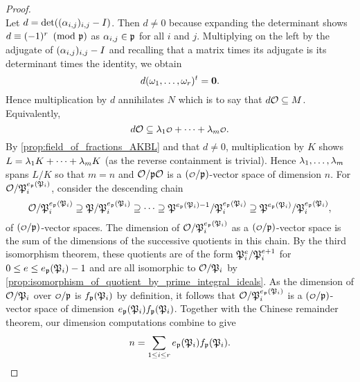 \begin{proof}
\[      \]
      Let $d = \det((\alpha_{i,j})_{i,j}-I)$. Then $d \neq 0$ because expanding the determinant shows $d \equiv (-1)^{r} \ \left(\text{mod }\mathfrak{p}\right)$ as $\alpha_{i,j} \in \mathfrak{p}$ for all $i$ and $j$. Multiplying on the left by the adjugate of $(\alpha_{i,j})_{i,j}-I$ and recalling that a matrix times its adjugate is its determinant times the identity, we obtain
      \[
        d(\omega_{1},\ldots,\omega_{r})^{t} = \mathbf{0}.
      \]
      Hence multiplication by $d$ annihilates $N$ which is to say that $d\mathcal{O} \subseteq M$. Equivalently,
      \[
        d\mc{O} \subseteq \l_{1}\smc{O}+\cdots+\l_{m}\smc{O}.
      \]
      By \cref{prop:field_of_fractions_AKBL} and that $d \neq 0$, multiplication by $K$ shows $L = \lambda_{1}K+\cdots+\lambda_{m}K$ (as the reverse containment is trivial). Hence $\lambda_{1},\ldots,\lambda_{m}$ spans $L/K$ so that $m = n$ and $\mathcal{O}/\mathfrak{p}\mathcal{O}$ is a $(\smc{O}/\mf{p})$-vector space of dimension $n$. For $\mathcal{O}/\mathfrak{P}_{i}^{e_{\mathfrak{p}}(\mathfrak{P}_{i})}$, consider the descending chain
      \[
        \mathcal{O}/\mathfrak{P}_{i}^{e_{\mathfrak{p}}(\mathfrak{P}_{i})} \supseteq \mathfrak{P}/\mathfrak{P}_{i}^{e_{\mathfrak{p}}(\mathfrak{P}_{i})} \supseteq \cdots \supseteq \mathfrak{P}^{e_{\mathfrak{p}}(\mathfrak{P}_{i})-1}/\mathfrak{P}_{i}^{e_{\mathfrak{p}}(\mathfrak{P}_{i})} \supseteq \mathfrak{P}^{e_{\mathfrak{p}}(\mathfrak{P}_{i})}/\mathfrak{P}_{i}^{e_{\mathfrak{p}}(\mathfrak{P}_{i})},
      \]
      of $(\smc{O}/\mf{p})$-vector spaces. The dimension of $\mathcal{O}/\mathfrak{P}_{i}^{e_{\mathfrak{p}}(\mathfrak{P}_{i})}$ as a $(\smc{O}/\mf{p})$-vector space is the sum of the dimensions of the successive quotients in this chain. By the third isomorphism theorem, these quotients are of the form $\mathfrak{P}_{i}^{e}/\mathfrak{P}_{i}^{e+1}$ for $0 \le e \le e_{\mathfrak{p}}(\mathfrak{P}_{i})-1$ and are all isomorphic to $\mathcal{O}/\mathfrak{P}_{i}$ by \cref{prop:isomorphism_of_quotient_by_prime_integral_ideals}. As the dimension of $\mathcal{O}/\mathfrak{P}_{i}$ over $\smc{O}/\mf{p}$ is $f_{\mathfrak{p}}(\mathfrak{P}_{i})$ by definition, it follows that $\mathcal{O}/\mathfrak{P}_{i}^{e_{\mathfrak{p}}(\mathfrak{P}_{i})}$ is a $(\smc{O}/\mf{p})$-vector space of dimension $e_{\mathfrak{p}}(\mathfrak{P}_{i})f_{\mathfrak{p}}(\mathfrak{P}_{i})$. Together with the Chinese remainder theorem, our dimension computations combine to give
      \[
        n = \sum_{1 \le i \le r}e_{\mathfrak{p}}(\mathfrak{P}_{i})f_{\mathfrak{p}}(\mathfrak{P}_{i}).
      \]
    \end{proof}

